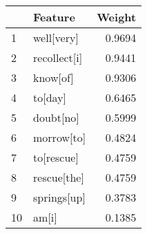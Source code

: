 \begin{tabular}{llr}
\toprule
{} &       Feature &  Weight \\
\midrule
1  &    well[very] &  0.9694 \\
2  &  recollect[i] &  0.9441 \\
3  &      know[of] &  0.9306 \\
4  &       to[day] &  0.6465 \\
5  &     doubt[no] &  0.5999 \\
6  &    morrow[to] &  0.4824 \\
7  &    to[rescue] &  0.4759 \\
8  &   rescue[the] &  0.4759 \\
9  &   springs[up] &  0.3783 \\
10 &         am[i] &  0.1385 \\
\bottomrule
\end{tabular}
